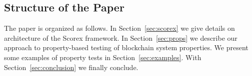 

\subsection{Structure of the Paper}

The paper is organized as follows. In Section~\ref{sec:scorex} we give details on architecture of the Scorex framework. In Section~\ref{sec:props} we describe our approach to property-based testing of blockchain system properties. We present some examples of property tests in Section~\ref{sec:examples}. With Section~\ref{sec:conclusion} we finally conclude.
